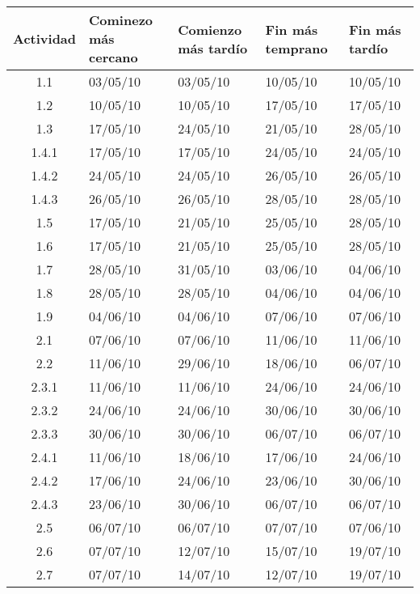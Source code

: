 \documentclass[11pt,a4paper,spanish,twoside]{report}
\begin{document}
\begin{table}[!h]
\centering
   \begin{tabular}{|c||b{2.4cm}<{\centering}|b{2.1cm}<{\centering}
       ||b{1.9cm}<{\centering}|b{1.6cm}<{\centering}|}
     \hline
     \textbf{Actividad} & \textbf{Cominezo más cercano} &\textbf{Comienzo más
     tardío} & \textbf{Fin más temprano}& \textbf{Fin más tardío}\\
     \hline \hline
     1.1   & 03/05/10 & 03/05/10 & 10/05/10 & 10/05/10 \\
     1.2   & 10/05/10 & 10/05/10 & 17/05/10 & 17/05/10 \\
     1.3   & 17/05/10 & 24/05/10 & 21/05/10 & 28/05/10 \\
     1.4.1 & 17/05/10 & 17/05/10 & 24/05/10 & 24/05/10 \\
     1.4.2 & 24/05/10 & 24/05/10 & 26/05/10 & 26/05/10 \\
     1.4.3 & 26/05/10 & 26/05/10 & 28/05/10 & 28/05/10 \\
     1.5   & 17/05/10 & 21/05/10 & 25/05/10 & 28/05/10 \\
     1.6   & 17/05/10 & 21/05/10 & 25/05/10 & 28/05/10 \\
     1.7   & 28/05/10 & 31/05/10 & 03/06/10 & 04/06/10 \\
     1.8   & 28/05/10 & 28/05/10 & 04/06/10 & 04/06/10 \\
     1.9   & 04/06/10 & 04/06/10 & 07/06/10 & 07/06/10 \\
     \hline
     2.1   & 07/06/10 & 07/06/10 & 11/06/10 & 11/06/10 \\
     2.2   & 11/06/10 & 29/06/10 & 18/06/10 & 06/07/10 \\
     2.3.1 & 11/06/10 & 11/06/10 & 24/06/10 & 24/06/10 \\
     2.3.2 & 24/06/10 & 24/06/10 & 30/06/10 & 30/06/10 \\
     2.3.3 & 30/06/10 & 30/06/10 & 06/07/10 & 06/07/10 \\
     2.4.1 & 11/06/10 & 18/06/10 & 17/06/10 & 24/06/10 \\
     2.4.2 & 17/06/10 & 24/06/10 & 23/06/10 & 30/06/10 \\
     2.4.3 & 23/06/10 & 30/06/10 & 06/07/10 & 06/07/10 \\
     2.5   & 06/07/10 & 06/07/10 & 07/07/10 & 07/06/10 \\
     2.6   & 07/07/10 & 12/07/10 & 15/07/10 & 19/07/10 \\
     2.7   & 07/07/10 & 14/07/10 & 12/07/10 & 19/07/10 \\

\end{tabular}
\end{table}
\end{document}
